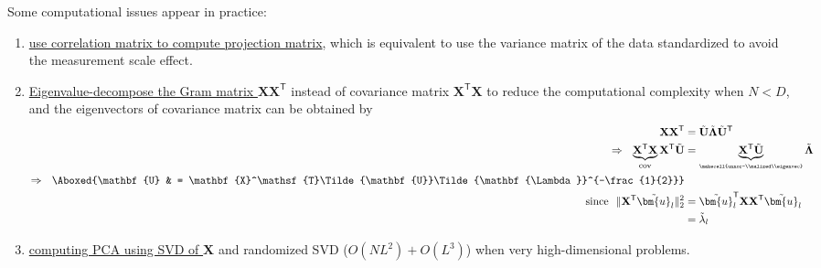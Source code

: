 Some computational issues appear in practice:
\begin{enumerate}[(1)]
    \item \uline{use correlation matrix to compute projection matrix}, which is equivalent to use the variance matrix of the data standardized to avoid the measurement scale effect.
    
    \item \uline{Eigenvalue-decompose the Gram matrix $\mathbf{XX}^\mathsf{T}$} 
    instead of covariance matrix $\mathbf{X}^\mathsf{T}\mathbf{X}$ to reduce the computational complexity 
    when $N<D$, and the eigenvectors of covariance matrix can be obtained by
    \begin{align}
        \mathbf{XX}^\mathsf{T}
        & = \Tilde{\mathbf{U}}\Tilde{\mathbf{\Lambda}}\Tilde{\mathbf{U}}^\mathsf{T} \label{eq:pcagram}\\
        \Rightarrow~~ 
        \underbrace{\mathbf{X}^\mathsf{T}\mathbf{X}}_\text{cov}\mathbf{X}^\mathsf{T}\Tilde{\mathbf{U}} 
        & = \underbrace{\mathbf{X}^\mathsf{T}\Tilde{\mathbf{U}}}_\text{\tiny\makecell{unnor-\\malized\\eigenvec}}\Tilde{\mathbf{\Lambda}} \\
        \Rightarrow~~
        \Aboxed{\mathbf{U} & =
        \mathbf{X}^\mathsf{T}\Tilde{\mathbf{U}}\Tilde{\mathbf{\Lambda}}^{-\frac{1}{2}}} \label{eq:pcagramsol} \\
        \text{since}~~
        \|\mathbf{X}^\mathsf{T}\Tilde{\bm{u}}_l\|_2^2
        & = \Tilde{\bm{u}}_l^\mathsf{T}\mathbf{XX}^\mathsf{T}\Tilde{\bm{u}}_l \\
        & = \Tilde{\lambda}_l
    \end{align}

    \item \uline{computing PCA using SVD of $\mathbf{X}$} and randomized SVD ($O(NL^2) + O(L^3)$) when very high-dimensional problems.
\end{enumerate}



